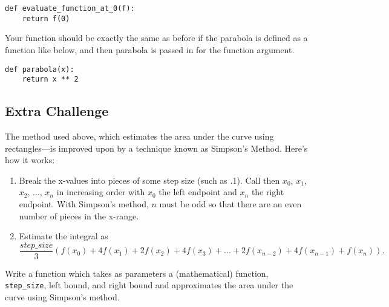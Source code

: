 \documentclass{hitec}
\begin{document}
\begin{lstlisting}
def evaluate_function_at_0(f):
	return f(0)
\end{lstlisting}

\noindent Your function should be exactly the same as before if the parabola is defined as a function like below, and then parabola is passed in for the function argument.

\begin{lstlisting}
def parabola(x):
	return x ** 2
\end{lstlisting}

\subsection{Extra Challenge}
The method used above, which estimates the area under the curve using rectangles---is improved upon by a technique known as Simpson's Method. Here's how it works:

\begin{enumerate}
	\item Break the x-values into pieces of some step size (such as .1). Call then $x_0$, $x_1$, $x_2$, ..., $x_n$ in increasing order with $x_0$ the left endpoint and $x_n$ the right endpoint. With Simpson's method, $n$ must be odd so that there are an even number of pieces in the x-range.
	\item Estimate the integral as $$\frac{step\_size}{3}(f(x_0)+4f(x_1)+2f(x_2)+4f(x_3)+...+2f(x_{n-2})+4f(x_{n-1})+f(x_n)).$$
\end{enumerate}

\noindent Write a function which takes as parameters a (mathematical) function, \texttt{step\_size}, left bound, and right bound and approximates the area under the curve using Simpson's method.
\end{document}
